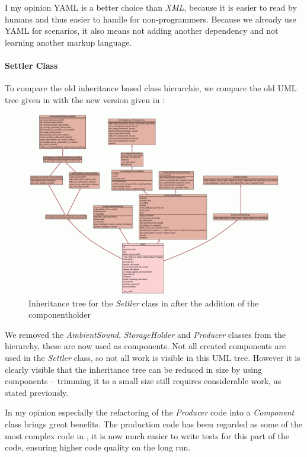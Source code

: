 I my opinion YAML is a better choice than \textit{XML}, because it is easier to read by humans and thus easier to handle
for non-programmers. Because we already use YAML for scenarios, it also means not adding another dependency and not
learning another markup language.

\paragraph{Settler Class}
To compare the old inheritance based class hierarchie, we compare the old UML tree given in  with
the new version given in :

\begin{figure}[!htb]
\includegraphics[angle=90,scale=0.35]{pics/settler_umlv}
\caption{Inheritance tree for the \textit{Settler} class in \UH{} after the addition of the componentholder}
\label{fig:settleruml2}
\end{figure}

We removed the \textit{AmbientSound}, \textit{StorageHolder} and \textit{Producer} classes from the hierarchy, these are now used as components.
Not all created components are used in the \textit{Settler} class, so not all work is visible in this UML tree. However
it is clearly visible that the inheritance tree can be reduced in size by using components -- trimming it to a
small size still requires considerable work, as stated previously.

In my opinion especially the refactoring of the \textit{Producer} code into a \textit{Component} class brings great
benefits. The production code has been regarded as some of the most complex code in \UH{}, it is now much easier to
write tests for this part of the code, ensuring higher code quality on the long run.

